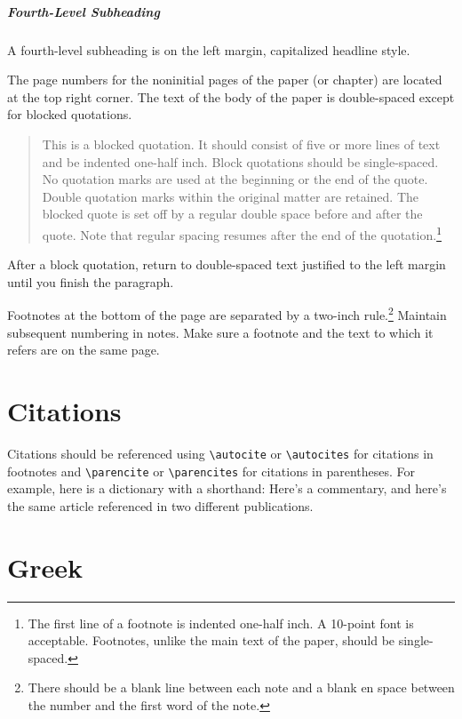 \documentclass[letterpaper,12pt]{article}
\newif\ifxetexorluatex
\begin{document}
\subparagraph{Fourth-Level Subheading}

A fourth-level subheading is on the left margin, capitalized headline style.

The page numbers for the noninitial pages of the paper (or chapter) are
located at the top right corner. The text of the body of the paper is
double-spaced except for blocked
quotations.
\begin{quote}
  This is a blocked quotation. It should consist of five or more lines of text
  and be indented one-half inch. Block quotations should be single-spaced. No
  quotation marks are used at the beginning or the end of the quote. Double
  quotation marks within the original matter are retained. The blocked quote
  is set off by a regular double space before and after the quote. Note that
  regular spacing resumes after the end of the quotation.\footnote{The first
  line of a footnote is indented one-half inch. A 10-point font is acceptable.
  Footnotes, unlike the main text of the paper, should be single-spaced.}
\end{quote}
After a block quotation, return to double-spaced text justified to the left
margin until you finish the paragraph.

%
Footnotes at the bottom of the page are separated by a two-inch
rule.\footnote{There should be a blank line between each note and a blank en
space between the number and the first word of the note.} Maintain subsequent
numbering in notes. Make sure a footnote and the text to which it refers are
on the same page.

\section{Citations}

%
Citations should be referenced using \verb+\autocite+ or \verb+\autocites+ for
citations in footnotes and \verb+\parencite+ or \verb+\parencites+ for
citations in parentheses. For example, here is a dictionary with a shorthand:
Here's a commentary,\autocite{adamsCompositeCitationsAntiquity2020a} and here's
the same article referenced in two different
publications.\autocites{adamsCompositeCitationsAntiquity2020a,aejmelaeusTrailSeptuagintTranslators2007}

\section{Greek\ifxetexorluatex{} and Hebrew\fi}
\end{document}
